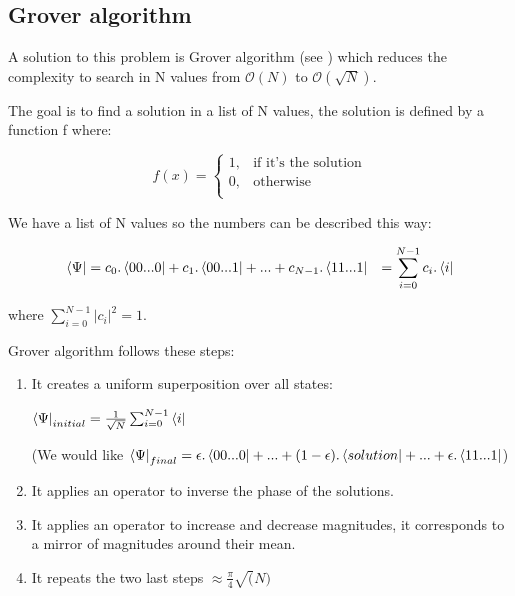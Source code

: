 \subsection{Grover algorithm}

A solution to this problem is Grover algorithm (see \cite{groverWiki}) which reduces the complexity to search in N values from $\mathcal{O}(N)$ to $\mathcal{O}(\sqrt{N})$. \newline

The goal is to find a solution in a list of N values, the solution is defined by a function f where:

\[
  f(x) =
  \begin{cases}
    1, & \text{if it's the solution}  \\
    0, & \text{otherwise} \\
  \end{cases}
\]
\medskip

We have a list of N values so the numbers can be described this way:

\begin{equation}
  \begin{aligned}
    \bra{\Psi} &= c_0 . \bra{00...0} + c_1 . \bra{00...1} + ... + c_{N-1} . \bra{11...1}
    &= \sum_{i=0}^{N-1} c_i . \bra{i}
  \end{aligned}
\end{equation}

where $\sum_{i=0}^{N-1} | c_i |^2 = 1$. \newline

Grover algorithm follows these steps: \newline

\begin{enumerate}
  \item It creates a uniform superposition over all states: \newline

  $\bra{\Psi}_{initial} = \frac{1}{\sqrt{N}} \sum_{i=0}^{N-1} \bra{i}$ \newline

  (We would like $\bra{\Psi}_{final} = \epsilon . \bra{00...0} + ... + (1 - \epsilon) . \bra{solution} + ... + \epsilon . \bra{11...1}$)

  \item It applies an operator to inverse the phase of the solutions.
  \item It applies an operator to increase and decrease magnitudes, it corresponds to a mirror of magnitudes around their mean.
  \item It repeats the two last steps $\approx \frac{\pi}{4} \sqrt(N)$

\end{enumerate}
\medskip

